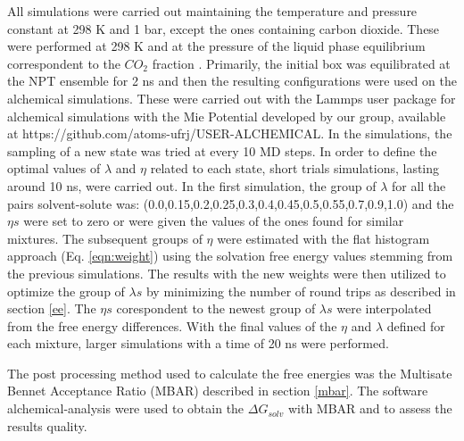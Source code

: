 All simulations were carried out maintaining the temperature and pressure constant at 298 K and 1 bar, except the ones containing carbon dioxide. These were performed at 298 K and at the pressure of the liquid phase equilibrium correspondent to the $CO_{2}$ fraction \cite{co2toliq}. Primarily, the initial box was equilibrated at the NPT ensemble for 2 ns and then the resulting configurations were used on the alchemical simulations. These were carried out with the Lammps user package for alchemical simulations with the Mie Potential developed by our group, available at https://github.com/atoms-ufrj/USER-ALCHEMICAL. In the simulations, the sampling of a new state was tried at every 10 MD steps. In order to define the optimal values of $\lambda$ and $\eta$ related to each state, short trials simulations, lasting around 10 ns, were carried out. In the first simulation, the group of $\lambda$ for all the pairs solvent-solute was: (0.0,0.15,0.2,0.25,0.3,0.4,0.45,0.5,0.55,0.7,0.9,1.0) and the $\eta s$ were set to zero or were given the values of the ones found for similar mixtures. The subsequent groups of $\eta$ were estimated  with the flat histogram approach (Eq. \eqref{eqn:weight}) using the solvation free energy values stemming from the previous simulations. The results with the new weights were then utilized to optimize the group of $\lambda s$ by minimizing the number of round trips as described in section \ref{ee}. The $\eta s$ corespondent to the newest group of $\lambda s$ were interpolated from the free energy differences. With the final values of the $\eta$ and $\lambda $ defined for each mixture, larger simulations with a time of 20 ns were performed. 

The post processing method used to calculate the free energies was the Multisate Bennet Acceptance Ratio (MBAR) described in section \ref{mbar}. The software alchemical-analysis \cite{klimovich} were used to obtain the $\Delta G_{solv}$ with MBAR and to assess the results quality.


